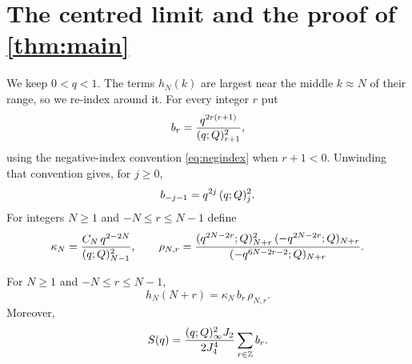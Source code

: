 \section{The centred limit and the proof of \texorpdfstring{\cref{thm:main}}{Theorem 1.1}}\label{sec:limit}

We keep $0<q<1$. The terms $h_N(k)$ are largest near the middle $k\approx N$ of
their range, so we re-index around it. For every integer $r$ put
\begin{equation}\label{eq:br}
b_r=\frac{q^{2r(r+1)}}{(q;Q)_{r+1}^2},
\end{equation}
using the negative-index convention \eqref{eq:negindex} when $r+1<0$. Unwinding
that convention gives, for $j\ge0$,
\begin{equation}\label{eq:bneg}
b_{-j-1}=q^{2j}\,(q;Q)_{j}^2 .
\end{equation}
For integers $N\ge1$ and $-N\le r\le N-1$ define
\begin{equation}\label{eq:kappa}
\kappa_N=\frac{C_N\,q^{2-2N}}{(q;Q)_{N-1}^2},\qquad
\rho_{N,r}=\frac{(q^{2N-2r};Q)_{N+r}^2\,(-q^{2N-2r};Q)_{N+r}}
{(-q^{6N-2r-2};Q)_{N+r}} .
\end{equation}

\begin{lemma}\label{lem:centre}
For $N\ge1$ and $-N\le r\le N-1$,
\begin{equation}\label{eq:centre}
h_N(N+r)=\kappa_N\,b_r\,\rho_{N,r}.
\end{equation}
Moreover,
\begin{equation}\label{eq:Sb}
S(q)=\frac{(q;Q)_{\infty}^2J_2}{2J_4^4}\sum_{r\in\mathbb{Z}}b_r .
\end{equation}
\end{lemma}

